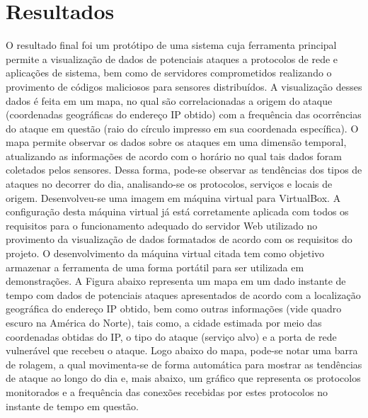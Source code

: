 \documentclass[%
        TwoSidePages,%
        Portuguese,%
        TablesPage,%
        FiguresPage,%
        ]
{ic-tese-v2}
\begin{document}
\chapter{Resultados}
O resultado final foi um protótipo de uma sistema cuja ferramenta principal permite a visualização de dados de potenciais ataques a protocolos de rede e aplicações de sistema, bem como de servidores comprometidos realizando o provimento de códigos maliciosos para sensores distribuídos. A visualização desses dados é feita em um mapa, no qual são correlacionadas a origem do ataque (coordenadas geográficas do endereço IP obtido) com a frequência das ocorrências do ataque em questão (raio do círculo impresso em sua coordenada específica).
O mapa permite observar os dados sobre os ataques em uma dimensão temporal, atualizando as informações de acordo com o horário no qual tais dados foram coletados pelos sensores. Dessa forma, pode-se observar as tendências dos tipos de ataques no decorrer do dia, analisando-se os protocolos, serviços e locais de origem.
Desenvolveu-se uma imagem em máquina virtual para VirtualBox. A configuração desta máquina virtual já está corretamente aplicada com todos os requisitos para o funcionamento adequado do servidor Web utilizado no provimento da visualização de dados formatados de acordo com os requisitos do projeto. O desenvolvimento da máquina virtual citada tem como objetivo armazenar a ferramenta de uma forma portátil para ser utilizada em demonstrações. A Figura abaixo representa um mapa em um dado instante de tempo com dados de potenciais ataques apresentados de acordo com a localização geográfica do endereço IP obtido, bem como outras informações (vide quadro escuro na América do Norte), tais como, a cidade estimada por meio das coordenadas obtidas do IP, o tipo do ataque (serviço alvo) e a porta de rede vulnerável que recebeu o ataque. Logo abaixo do mapa, pode-se notar uma barra de rolagem, a qual movimenta-se de forma automática para mostrar as tendências de ataque ao longo do dia e, mais abaixo, um gráfico que representa os protocolos monitorados e a frequência das conexões recebidas por estes protocolos no instante de tempo em questão.
\end{document}
